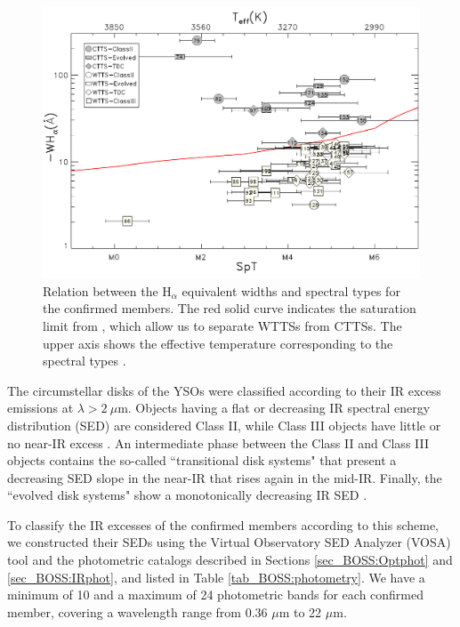 \documentclass[12pt]{article}
\newcounter{subsubsubsection}[subsubsection]
\begin{document}
\begin{figure}
	\begin{minipage}{0.60\textwidth}
		\includegraphics[width=1.0\textwidth]{f7.pdf}
	\end{minipage} \hfill
	\begin{minipage}{0.35\textwidth}
		\caption[TTS classification of the confirmed members from the BOSS spectra]{Relation between the H$_\alpha$ equivalent widths and spectral types for the confirmed members. The red solid curve indicates the saturation limit from \citet{BarradoYNavascues-Martin2003}, which allow us to separate WTTSs from CTTSs. The upper axis shows the effective temperature corresponding to the spectral types \citep{Luhman2003b}.}
		\label{fig_BOSS:WHavsSpT}
	\end{minipage}
\end{figure}

\label{sec_BOSS:SED}

The circumstellar disks of the YSOs were classified according to their IR excess emissions at $\lambda>2\ \mu$m. Objects having a flat or decreasing IR spectral energy distribution (SED) are considered Class II, while Class III objects have little or no near-IR excess \citep{Lada-Wilking1984,Lada1987}. An intermediate phase between the Class II and Class III objects contains the so-called ``transitional disk systems" that present a decreasing SED slope in the near-IR that rises again in the mid-IR. Finally, the ``evolved disk systems" show a monotonically decreasing IR SED \citep[e.g.,][]{Hernandez2007b}.

To classify the IR excesses of the confirmed members according to this scheme, we constructed their SEDs using the Virtual Observatory SED Analyzer (VOSA) tool \citep{Bayo2008} and the photometric catalogs described in Sections \ref{sec_BOSS:Optphot} and \ref{sec_BOSS:IRphot}, and listed in Table \ref{tab_BOSS:photometry}. We have a minimum of 10 and a maximum of 24 photometric bands for each confirmed member, covering a wavelength range from 0.36 $\mu$m to 22 $\mu$m.
\end{document}

